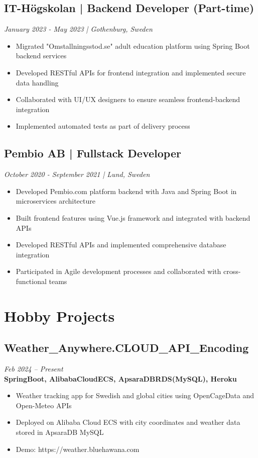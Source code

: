 \documentclass[11pt,a4paper]{article}
\begin{document}
\subsection*{IT-Högskolan | Backend Developer (Part-time)}
\textit{January 2023 - May 2023 | Gothenburg, Sweden}
\begin{itemize}[noitemsep]
\item Migrated "Omstallningsstod.se" adult education platform using Spring Boot backend services
\item Developed RESTful APIs for frontend integration and implemented secure data handling
\item Collaborated with UI/UX designers to ensure seamless frontend-backend integration
\item Implemented automated tests as part of delivery process
\end{itemize}

\subsection*{Pembio AB | Fullstack Developer}
\textit{October 2020 - September 2021 | Lund, Sweden}
\begin{itemize}[noitemsep]
\item Developed Pembio.com platform backend with Java and Spring Boot in microservices architecture
\item Built frontend features using Vue.js framework and integrated with backend APIs
\item Developed RESTful APIs and implemented comprehensive database integration
\item Participated in Agile development processes and collaborated with cross-functional teams
\end{itemize}


\section*{Hobby Projects}

\subsection{Weather\_Anywhere.CLOUD\_API\_Encoding}
\textit{Feb 2024 -- Present} \\
\textbf{SpringBoot, AlibabaCloudECS, ApsaraDBRDS(MySQL), Heroku}
\begin{itemize}
\item Weather tracking app for Swedish and global cities using OpenCageData and Open-Meteo APIs
\item Deployed on Alibaba Cloud ECS with city coordinates and weather data stored in ApsaraDB MySQL
\item Demo: https://weather.bluehawana.com
\end{itemize}
\end{document}
